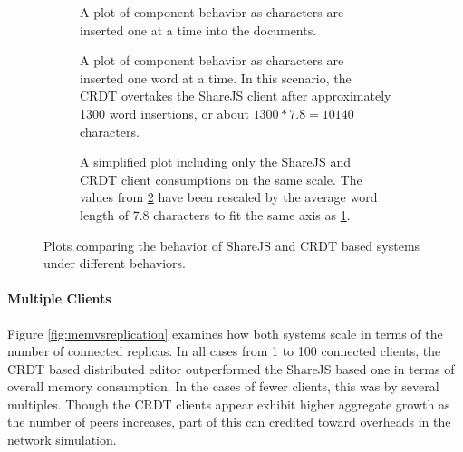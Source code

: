 \documentclass[12pt,a4paper,twoside,openright]{report}
\begin{document}
				\begin{figure} [H]
				\centering
				\begin{subfigure}[t]{.45\textwidth}
				  \centering
				  
				  \caption[Single Client Memory Consumption with Character Insertion] {A plot of component behavior as characters are inserted one at a time into the documents.}
				  \label{fig:sub1}
				\end{subfigure}%
				\begin{subfigure}[t]{.45\textwidth}
				  \centering
				  
				  \caption{A plot of component behavior as characters are inserted one word at a time. In this scenario, the CRDT overtakes the ShareJS client after approximately 1300 word insertions, or about $1300*7.8 = 10140$ characters.}
				  \label{fig:sub2}
				\end{subfigure}
				\begin{subfigure}[t]{0.6\textwidth}
				  \centering
			  	  
				  \caption{A simplified plot including only the ShareJS and CRDT client consumptions on the same scale. The values from \ref{fig:sub2} have been rescaled by the average word length of 7.8 characters to fit the same axis as \ref{fig:sub1}.}
				  \label{fig:sub3}
				\end{subfigure}
				\caption[Single Client Memory Consumption]{Plots comparing the behavior of ShareJS and CRDT based systems under different behaviors.}
				\label{fig:singleclientmemory}
				\end{figure}
				
				
				
			\paragraph{Multiple Clients}
				Figure \ref{fig:memvsreplication} examines how both systems scale in terms of the number of connected replicas. In all cases from 1 to 100 connected clients, the CRDT based distributed editor outperformed the ShareJS based one in terms of overall memory consumption. In the cases of fewer clients, this was by several multiples. Though the CRDT clients appear exhibit higher aggregate growth as the number of peers increases, part of this can credited toward overheads in the network simulation.
			
\end{document}
